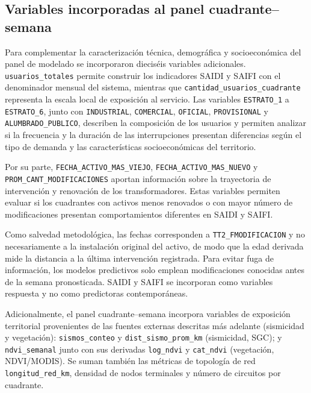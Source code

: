 \subsection{Variables incorporadas al panel cuadrante--semana}

Para complementar la caracterización técnica, demográfica y socioeconómica
del panel de modelado se incorporaron dieciséis variables adicionales.
\texttt{usuarios\_totales} permite construir los indicadores SAIDI y SAIFI
con el denominador mensual del sistema, mientras que
\texttt{cantidad\_usuarios\_cuadrante} representa la escala local de
exposición al servicio. Las variables \texttt{ESTRATO\_1} a
\texttt{ESTRATO\_6}, junto con \texttt{INDUSTRIAL}, \texttt{COMERCIAL},
\texttt{OFICIAL}, \texttt{PROVISIONAL} y
\texttt{ALUMBRADO\_PUBLICO}, describen la composición de los usuarios y
permiten analizar si la frecuencia y la duración de las interrupciones
presentan diferencias según el tipo de demanda y las características
socioeconómicas del territorio.

Por su parte, \texttt{FECHA\_ACTIVO\_MAS\_VIEJO},
\texttt{FECHA\_ACTIVO\_MAS\_NUEVO} y
\texttt{PROM\_CANT\_MODIFICACIONES} aportan información sobre la trayectoria
de intervención y renovación de los transformadores. Estas variables
permiten evaluar si los cuadrantes con activos menos renovados o con mayor
número de modificaciones presentan comportamientos diferentes en SAIDI y
SAIFI.

Como salvedad metodológica, las fechas corresponden a
\texttt{TT2\_FMODIFICACION} y no necesariamente a la instalación original
del activo, de modo que la edad derivada mide la distancia a la última
intervención registrada. Para evitar fuga de información, los modelos
predictivos solo emplean modificaciones conocidas antes de la semana
pronosticada. SAIDI y SAIFI se incorporan como variables respuesta y no como
predictoras contemporáneas.

Adicionalmente, el panel cuadrante--semana incorpora variables de exposición territorial provenientes de las fuentes externas descritas más adelante (sismicidad y vegetación): \texttt{sismos\_conteo} y \texttt{dist\_sismo\_prom\_km} (sismicidad, SGC); y \texttt{ndvi\_semanal} junto con sus derivadas \texttt{log\_ndvi} y \texttt{cat\_ndvi} (vegetación, NDVI/MODIS). Se suman también las métricas de topología de red \texttt{longitud\_red\_km}, densidad de nodos terminales y número de circuitos por cuadrante.

